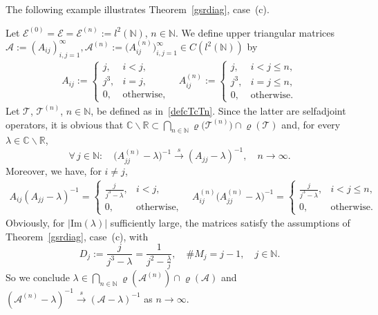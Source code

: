 \documentclass[a4paper,reqno]{amsart}
\begin{document}
The following example illustrates Theorem~\ref{gsrdiag}, case~(c).
\begin{example}
Let ${\mathcal E}^{(0)}={\mathcal E}={\mathcal E}^{(n)}:=l^2({\mathbb{N}})$, $n\in{\mathbb{N}}$.
We define upper triangular matrices ${\mathcal A}:=(A_{ij})_{i,j=1}^{\infty}, {\mathcal A}^{(n)}:=\big(A_{ij}^{(n)}\big)_{i,j=1}^{\infty}\in C(l^2({\mathbb{N}}))$ by
\begin{align*}
A_{ij}:=\begin{cases} j, &i< j,\\ j^3, &i=j,\\ 0, &\text{otherwise},\end{cases}
\quad 
A_{ij}^{(n)}:=\begin{cases} j, &i< j \leq n,\\ j^3, &i=j\leq n,\\ 0, &\text{otherwise}.\end{cases}
\end{align*}
Let ${\mathcal T}$, ${\mathcal T}^{(n)}$, $n\in{\mathbb{N}}$, be defined as in~\eqref{defcTcTn}.
Since the latter are selfadjoint operators,
it is obvious that ${\mathbb{C}}\backslash{\mathbb{R}}\subset\underset{n\in{\mathbb{N}}}{\bigcap}\varrho\big({\mathcal T}^{(n)}\big)\cap\varrho({\mathcal T})$
and, for every $\lambda\in{\mathbb{C}}\backslash{\mathbb{R}}$,
$$\forall\,j\in{\mathbb{N}}:\quad \big(A_{jj}^{(n)}-\lambda\big)^{-1}{\stackrel{s}{\longrightarrow}} (A_{jj}-\lambda)^{-1}, \quad n\to\infty.$$
Moreover, we have, for $i\neq j$,
\begin{align*}
A_{ij}(A_{jj}-\lambda)^{-1}=\begin{cases}\frac{ j}{j^3-\lambda}, &i< j,\\ 0, &\text{otherwise},\end{cases}
\quad 
A_{ij}^{(n)}\big(A_{jj}^{(n)}-\lambda\big)^{-1}=\begin{cases} \frac{j}{j^3-\lambda}, &i<j \leq n,\\ 0, &\text{otherwise}.\end{cases}
\end{align*}
Obviously, for $|{\mathrm{Im}}(\lambda)|$ sufficiently large, the matrices satisfy the assumptions  of  Theorem~\ref{gsrdiag}, case~(c),
with $$D_j:=\frac{j}{j^3-\lambda}=\frac{1}{j^2-\frac\lambda{j}}, \quad \# M_j=j-1, \quad j\in{\mathbb{N}}.$$
So we conclude $\lambda\in\underset{n\in{\mathbb{N}}}{\bigcap}\varrho({\mathcal A}^{(n)})\cap\varrho({\mathcal A})$ and 
$({\mathcal A}^{(n)}-\lambda)^{-1}{\stackrel{s}{\rightarrow}}({\mathcal A}-\lambda)^{-1}$ as $n\to\infty.$
\end{example}
\end{document}
